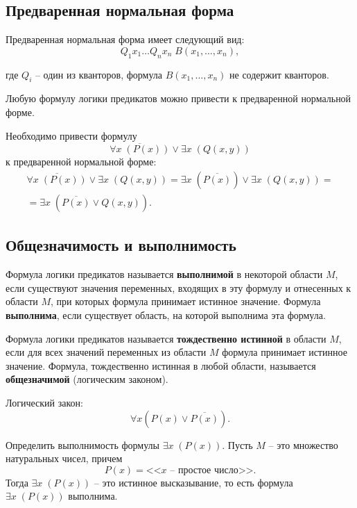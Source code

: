\subsection{Предваренная нормальная форма}

Предваренная нормальная форма имеет следующий вид:
\[
    Q_1 x_1 \ldots Q_n x_n \; B(x_1, \ldots, x_n),
\]

где \(Q_i\) -- один из кванторов, формула \(B(x_1, \ldots, x_n)\) не содержит кванторов.

\begin{theorem*}
    Любую формулу логики предикатов можно привести к предваренной нормальной форме.
\end{theorem*}

\begin{example*}
    Необходимо привести формулу
    \[
        \overline{\forall x \; (P(x))} \lor \exists x \; (Q(x, y))
    \]
    к предваренной нормальной форме:
    \begin{gather*}
        \overline{\forall x \; (P(x))} \lor \exists x \; (Q(x, y)) =
        \exists x \; (\overline{P(x)}) \lor \exists x \; (Q(x, y)) = \\=
        \exists x \; (\overline{P(x)} \lor Q(x, y)).
    \end{gather*}
\end{example*}

\subsection{Общезначимость и выполнимость}

Формула логики предикатов называется \textbf{выполнимой} в некоторой области \(M\), если существуют значения переменных, входящих в эту формулу и отнесенных к области \(M\), при которых формула принимает истинное значение. Формула \textbf{выполнима}, если существует область, на которой выполнима эта формула.

Формула логики предикатов называется \textbf{тождественно истинной} в области \(M\), если для всех значений переменных из области \(M\) формула принимает истинное значение. Формула, тождественно истинная в любой области, называется \textbf{общезначимой} (логическим законом).

\begin{example}
    Логический закон:
    \[
        \forall x (P(x) \lor \overline{P(x)}).
    \]
\end{example}

\begin{example}
    Определить выполнимость формулы \(\exists x \; (P(x))\). Пусть \(M\) -- это множество натуральных чисел, причем
    \[
        P(x) = \text{<<\(x\) -- простое число>>}.
    \]
    Тогда \(\exists x \; (P(x))\) -- это истинное высказывание, то есть формула \(\exists x \; (P(x))\) выполнима.
\end{example}

